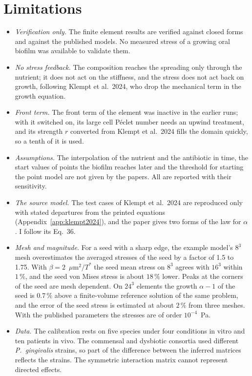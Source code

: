 \section{Limitations}
\label{sec:concl_limitations}

\begin{itemize}
  \item \emph{Verification only.} The finite element results are
        verified against closed forms and against the published models. No
        measured stress of a growing oral biofilm was available to validate
        them.
  \item \emph{No stress feedback.} The composition reaches the spreading only
        through the nutrient; it does not act on the stiffness, and the stress
        does not act back on growth, following Klempt et al.\ 2024, who drop the
        mechanical term in the growth equation.
  \item \emph{Front term.} The front term of the element was inactive in the
        earlier runs; with it switched on, its large cell P\'eclet number needs
        an upwind treatment, and its strength $r$ converted from Klempt et al.\ 2024
        fills the domain quickly, so a tenth of it is used.
  \item \emph{Assumptions.} The interpolation of the nutrient and the antibiotic
        in time, the start values of points the biofilm reaches later and the
        threshold for starting the point model are not given by the papers. All
        are reported with their sensitivity.
  \item \emph{The source model.} The test cases of Klempt et al.\ 2024 are
        reproduced only with stated departures from the printed equations
        (Appendix~\ref{app:klempt2024}), and the paper gives two forms of the
        law for $\alpha$. I follow its Eq.~36.
  \item \emph{Mesh and magnitude.} For a seed with a sharp edge, the example
        model's $8^3$ mesh overestimates the averaged stresses of the seed by a
        factor of 1.5 to 1.75. With $\beta=2$~$\mu$m$^2/T^*$ the seed mean stress
        on $8^3$ agrees with $16^3$ within $1\,\%$, and the seed von Mises stress
        is about $18\,\%$ lower. Peaks at the corners of the seed are mesh
        dependent. On $24^3$ elements the growth $\alpha-1$ of
        the seed is $0.7\,\%$ above a finite-volume reference solution of the same
        problem, and the error of the seed stress is estimated at about $2\,\%$
        from three meshes. With the published parameters the stresses
        are of order $10^{-4}$~Pa.
  \item \emph{Data.} The calibration rests on five species under four
        conditions in vitro and ten patients in vivo. The commensal and
        dysbiotic consortia used different \textit{P.~gingivalis} strains, so
        part of the difference between the inferred matrices reflects the
        strains. The symmetric interaction matrix cannot represent directed
        effects.
\end{itemize}

